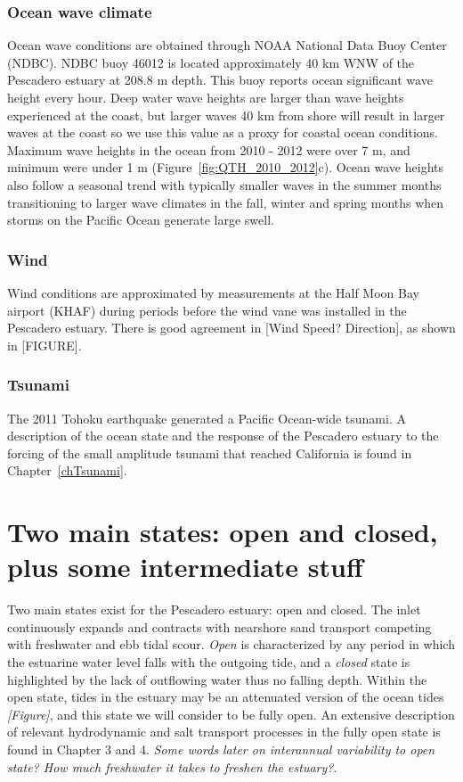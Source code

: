 \subsubsection{Ocean wave climate}
Ocean wave conditions are obtained through NOAA National Data Buoy Center (NDBC). NDBC buoy 46012 is located approximately 40 km WNW of the Pescadero estuary at 208.8 m depth. This buoy reports ocean significant wave height every hour. Deep water wave heights are larger than wave heights experienced at the coast, but larger waves 40 km from shore will result in larger waves at the coast so we use this value as a proxy for coastal ocean conditions. Maximum wave heights in the ocean from 2010 - 2012 were over 7 m, and minimum were under 1 m (Figure~\ref{fig:QTH_2010_2012}c). Ocean wave heights also follow a seasonal trend with typically smaller waves in the summer months transitioning to larger wave climates in the fall, winter and spring months when storms on the Pacific Ocean generate large swell.

\subsubsection{Wind}
Wind conditions are approximated by measurements at the Half Moon Bay airport (KHAF) during periods before the wind vane was installed in the Pescadero estuary.  There is good agreement in [Wind Speed? Direction], as shown in [FIGURE].

\subsubsection{Tsunami}
The 2011 Tohoku earthquake generated a Pacific Ocean-wide tsunami. A description of the ocean state and the response of the Pescadero estuary to the forcing of the small amplitude tsunami that reached California is found in Chapter~\ref{chTsunami}.



\section{Two main states: open and closed, plus some intermediate stuff}
\label{betterlabelmaybe}

Two main states exist for the Pescadero estuary: open and closed.  The inlet continuously expands and contracts with nearshore sand transport competing with freshwater and ebb tidal scour. \emph{Open} is characterized by any period in which the estuarine water level falls with the outgoing tide, and a \emph{closed} state is highlighted by the lack of outflowing water thus no falling depth. Within the open state, tides in the estuary may be an attenuated version of the ocean tides \emph{[Figure]}, and this state we will consider to be fully open. An extensive description of relevant hydrodynamic and salt transport processes in the fully open state is found in Chapter 3 and 4. \emph{Some words later on interannual variability to open state? How much freshwater it takes to freshen the estuary?}.

